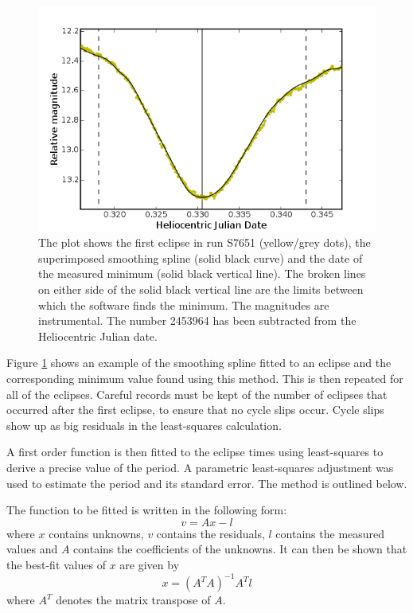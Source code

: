 \begin{figure}
\begin{center}
\includegraphics[width=0.85\columnwidth,bb=0 0 600 400]{images/eclipseminimum.png}
\caption[Measurement of eclipse minimum]{The plot shows the first eclipse in run S7651 (yellow/grey dots), the superimposed smoothing spline (solid black curve) and the date of the measured minimum (solid black vertical line). The broken lines on either side of the solid black vertical line are the limits between which the software finds the minimum. The magnitudes are instrumental. The number 2453964 has been subtracted from the Heliocentric Julian date.  }
\label{eclipseminimum}
\end{center}
\end{figure}


Figure \ref{eclipseminimum} shows an example of the smoothing spline fitted to an eclipse and the corresponding minimum value found using this method. This is then repeated for all of the eclipses. Careful records must be kept of the number of eclipses that occurred after the first eclipse, to ensure that no cycle slips occur. Cycle slips show up as big residuals in the least-squares calculation. 

A first order function is then fitted to the eclipse times using least-squares to derive a precise value of the period. A parametric least-squares adjustment was used to estimate the period and its standard error. The method is outlined below.

The function to be fitted is written in the following form: $$  v = Ax - l $$ where $x$ contains unknowns, $v$ contains the residuals, $l$ contains the measured values and $A$ contains the coefficients of the unknowns. It can then be shown that the best-fit values of $x$ are given by $$ x = (A^{T}A)^{-1}A^{T}l $$ where $A^{T}$ denotes the matrix transpose of $A$. 

